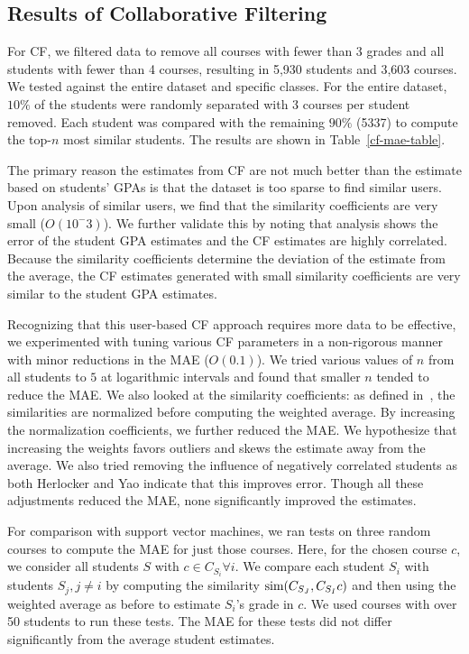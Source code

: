 \subsection{Results of Collaborative Filtering}

For CF, we filtered data to remove all courses with fewer than 3 grades and all students with fewer than 4 courses, resulting in 5,930 students and 3,603 courses.  We tested against the entire dataset and specific classes.  For the entire dataset, $10\%$ of the students were randomly separated with 3 courses per student removed.  Each student was compared with the remaining $90\%$ (5337) to compute the top-$n$ most similar students. The results are shown in Table~\ref{cf-mae-table}.

The primary reason the estimates from CF are not much better than the estimate based on students' GPAs is that the dataset is too sparse to find similar users.  Upon analysis of similar users, we find that the similarity coefficients are very small ($O(10^-3)$).  We further validate this by noting that analysis shows the error of the student GPA estimates and the CF estimates are highly correlated.  Because the similarity coefficients determine the deviation of the estimate from the average, the CF estimates generated with small similarity coefficients are very similar to the student GPA estimates.

Recognizing that this user-based CF approach requires more data to be effective, we experimented with tuning various CF parameters in a non-rigorous manner with minor reductions in the MAE ($O(0.1)$).  We tried various values of $n$ from all students to $5$ at logarithmic intervals and found that smaller $n$ tended to reduce the MAE.  We also looked at the similarity coefficients: as defined in~\cite{breese}, the similarities are normalized before computing the weighted average.  By increasing the normalization coefficients, we further reduced the MAE.  We hypothesize that increasing the weights favors outliers and skews the estimate away from the average.  We also tried removing the influence of negatively correlated students as both Herlocker and Yao indicate that this improves error.  Though all these adjustments reduced the MAE, none significantly improved the estimates. 

For comparison with support vector machines, we ran tests on three random courses to compute the MAE for just those courses.  Here, for the chosen course $c$, we consider all students $S$ with $c \in C_{S_i} \forall{i}$.  We compare each student $S_i$ with students $S_j, j \neq i$ by computing the similarity $\textrm{sim}(C_{S_J}, C_{S_I} \\ c)$ and then using the weighted average as before to estimate $S_i$'s grade in $c$.  We used courses with over 50 students to run these tests.  The MAE for these tests did not differ significantly from the average student estimates.

